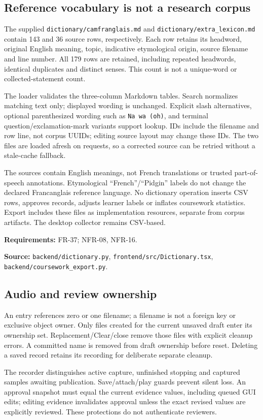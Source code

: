 \documentclass[11pt,a4paper]{article}
\newcommand{\viewtrace}[2]{\par\smallskip\noindent\textbf{Requirements:} #1.\par
  \noindent\textbf{Source:} #2.\par\medskip}
\begin{document}
\subsection{Reference vocabulary is not a research corpus}
The supplied \nolinkurl{dictionary/camfranglais.md} and
\nolinkurl{dictionary/extra_lexicon.md} contain 143 and 36 source rows,
respectively. Each row retains its headword, original English meaning,
topic, indicative etymological origin, source filename and line number.
All 179 rows are retained, including repeated headwords, identical duplicates
and distinct senses. This count is not a unique-word or collected-statement count.

The loader validates the three-column Markdown tables. Search normalizes
matching text only; displayed wording is unchanged. Explicit slash alternatives,
optional parenthesized wording such as \texttt{Na wa (oh)}, and terminal
question/exclamation-mark variants support lookup. IDs include the filename
and row line, not corpus UUIDs; editing source layout may change these IDs.
The two files are loaded afresh on requests, so a corrected source can be retried
without a stale-cache fallback.

The sources contain English meanings, not French translations or trusted
part-of-speech annotations. Etymological ``French''/``Pidgin'' labels do not
change the declared Francanglais reference language. No dictionary operation
inserts CSV rows, approves records, adjusts learner labels or inflates
coursework statistics. Export includes these files as implementation resources,
separate from corpus artifacts. The desktop collector remains CSV-based.
\viewtrace{FR-37; NFR-08, NFR-16}
{\nolinkurl{backend/dictionary.py}, \nolinkurl{frontend/src/Dictionary.tsx},
\nolinkurl{backend/coursework_export.py}}

\subsection{Audio and review ownership}
An entry references zero or one filename; a filename is not a foreign key or
exclusive object owner. Only files created for the current unsaved draft enter
its ownership set. Replacement/Clear/close remove those files with explicit
cleanup errors. A committed name is removed from draft ownership before reset.
Deleting a saved record retains its recording for deliberate separate cleanup.

The recorder distinguishes active capture, unfinished stopping and captured
samples awaiting publication. Save/attach/play guards prevent silent loss.
An approval snapshot must equal the current evidence values, including queued
GUI edits; editing evidence invalidates approval unless the exact revised
values are explicitly reviewed. These protections do not authenticate reviewers.
\end{document}
